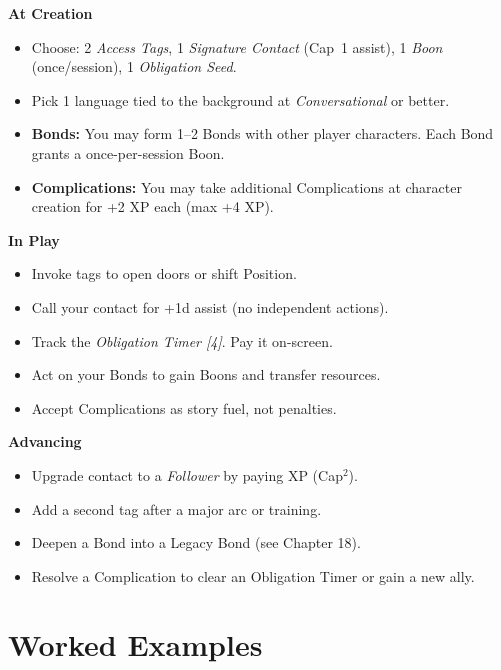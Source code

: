 \begin{tcolorbox}[colback=blue!5!white,colframe=blue!75!black,title=Background Quick Reference,fonttitle=\bfseries,breakable]
\textbf{At Creation}
\begin{itemize}
\item Choose: 2 \emph{Access Tags}, 1 \emph{Signature Contact} (Cap~1 assist), 1 \emph{Boon} (once/session), 1 \emph{Obligation Seed}.
\item Pick 1 language tied to the background at \emph{Conversational} or better.
\item \textbf{Bonds:} You may form 1--2 Bonds with other player characters. Each Bond grants a once-per-session Boon.
\item \textbf{Complications:} You may take additional Complications at character creation for +2 XP each (max +4 XP).
\end{itemize}

\textbf{In Play}
\begin{itemize}
\item Invoke tags to open doors or shift Position.
\item Call your contact for +1d assist (no independent actions).
\item Track the \emph{Obligation Timer [4]}. Pay it on-screen.
\item Act on your Bonds to gain Boons and transfer resources.
\item Accept Complications as story fuel, not penalties.
\end{itemize}

\textbf{Advancing}
\begin{itemize}
\item Upgrade contact to a \emph{Follower} by paying XP (Cap\(^2\)).
\item Add a second tag after a major arc or training.
\item Deepen a Bond into a Legacy Bond (see Chapter 18).
\item Resolve a Complication to clear an Obligation Timer or gain a new ally.
\end{itemize}
\end{tcolorbox}

\section{Worked Examples}

